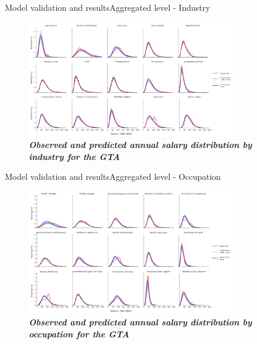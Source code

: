 \documentclass[aspectratio=169, xcolor=dvipsnames]{beamer}
\begin{document}
\begin{frame}{Model validation and results}{Aggregated level - Industry}
    \vspace*{-20pt}
    \begin{figure}
        \centering
        \includegraphics[width=0.8\textwidth]{./images/salary_ind.png}
        \captionsetup{labelformat=empty}
        \setlength{\abovecaptionskip}{-2pt}
        \caption{\fontsize{8pt}{8pt}\selectfont \textbf{\textit{Observed and predicted annual salary distribution by industry for the GTA}}}
    \end{figure}
\end{frame}

\begin{frame}{Model validation and results}{Aggregated level - Occupation}
    \vspace*{-20pt}
    \begin{figure}
        \centering
        \includegraphics[width=0.8\textwidth]{./images/salary_occ.png}
        \captionsetup{labelformat=empty}
        \setlength{\abovecaptionskip}{-2pt}
        \caption{\fontsize{8pt}{8pt}\selectfont \textbf{\textit{Observed and predicted annual salary distribution by occupation for the GTA}}}
    \end{figure}
\end{frame}
\end{document}
